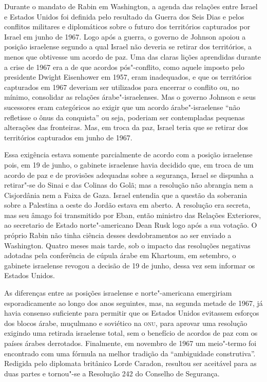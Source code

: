 Durante o mandato de Rabin em Washington, a agenda das relações entre
Israel e Estados Unidos foi definida pelo resultado da Guerra dos
Seis Dias e pelos conflitos militares e diplomáticos sobre o futuro dos
territórios capturados por Israel em junho de 1967. Logo após a guerra,
o governo de Johnson apoiou a posição israelense segundo a qual Israel
não deveria se retirar dos territórios, a menos que obtivesse um acordo
de paz. Uma das claras lições aprendidas durante a crise de 1967 era a
de que acordos pós"-conflito, como aquele imposto pelo presidente Dwight
Eisenhower em 1957, eram inadequados, e que os territórios capturados em
1967 deveriam ser utilizados para encerrar o conflito 
ou, no mínimo, consolidar as relações árabe"-israelenses. Mas o governo
Johnson e seus sucessores eram categóricos ao exigir que um acordo
árabe"-israelense ``não refletisse o ônus da conquista'' ou seja,
poderiam ser contempladas pequenas alterações das fronteiras. Mas, em
troca da paz, Israel teria que se retirar dos territórios capturados em
junho de 1967.

Essa exigência estava somente parcialmente de acordo com a posição
israelense pois, em 19 de junho, o gabinete israelense havia decidido
que, em troca de um acordo de paz e de provisões adequadas sobre a
segurança, Israel se dispunha a retirar"-se do Sinai e das Colinas do
Golã; mas a resolução não abrangia nem a Cisjordânia nem a Faixa de
Gaza. Israel entendia que a questão da soberania sobre a Palestina a
oeste do Jordão estava em aberto. A resolução era secreta, mas seu âmago
foi transmitido por Eban, então ministro das Relações Exteriores, ao secretario
de Estado norte"-americano Dean Rusk logo após a sua votação. O próprio
Rabin não tinha ciência desses desdobramentos ao ser enviado a
Washington. Quatro meses mais tarde, sob o impacto das resoluções
negativas adotadas pela conferência de cúpula árabe em Khartoum, em
setembro, o gabinete israelense revogou a decisão de 19 de junho, dessa
vez sem informar os Estados Unidos.

As diferenças entre as posições israelense e norte"-americana emergiriam
esporadicamente ao longo dos anos seguintes, mas, na segunda metade de
1967, já havia consenso suficiente para permitir que os Estados Unidos
evitassem esforços dos blocos árabe, muçulmano e soviético na \textsc{onu}, para
aprovar uma resolução exigindo uma retirada israelense total, sem o
benefício de acordos de paz com os países árabes derrotados. Finalmente,
em novembro de 1967 um meio"-termo foi encontrado com uma fórmula na
melhor tradição da ``ambiguidade construtiva''. Redigida pelo diplomata
britânico Lorde Caradon, resultou ser aceitável para as duas partes e
tornou"-se a Resolução 242 do Conselho de Segurança.


